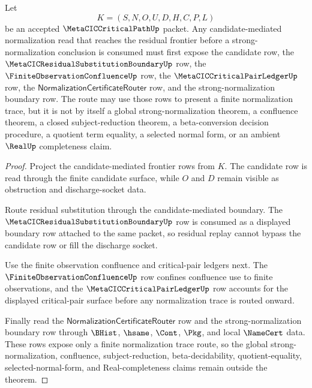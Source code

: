 \begin{theorem}
\label{thm:metacic-normalization-trace-residual-frontier-route}
Let
$$
K=(S,N,O,U,D,H,C,P,L)
$$
be an accepted $\MetaCICCriticalPathUp$ packet. Any candidate-mediated normalization read that reaches the residual frontier before a strong-normalization conclusion is consumed must first expose the candidate row, the $\MetaCICResidualSubstitutionBoundaryUp$ row, the $\FiniteObservationConfluenceUp$ row, the $\MetaCICCriticalPairLedgerUp$ row, the $\mathsf{NormalizationCertificateRouter}$ row, and the strong-normalization boundary row. The route may use those rows to present a finite normalization trace, but it is not by itself a global strong-normalization theorem, a confluence theorem, a closed subject-reduction theorem, a beta-conversion decision procedure, a quotient term equality, a selected normal form, or an ambient $\RealUp$ completeness claim.
\end{theorem}
\begin{proof}
Project the candidate-mediated frontier rows from $K$. The candidate row is read through the finite candidate surface, while $O$ and $D$ remain visible as obstruction and discharge-socket data.

Route residual substitution through the candidate-mediated boundary. The $\MetaCICResidualSubstitutionBoundaryUp$ row is consumed as a displayed boundary row attached to the same packet, so residual replay cannot bypass the candidate row or fill the discharge socket.

Use the finite observation confluence and critical-pair ledgers next. The $\FiniteObservationConfluenceUp$ row confines confluence use to finite observations, and the $\MetaCICCriticalPairLedgerUp$ row accounts for the displayed critical-pair surface before any normalization trace is routed onward.

Finally read the $\mathsf{NormalizationCertificateRouter}$ row and the strong-normalization boundary row through $\BHist$, $\hsame$, $\Cont$, $\Pkg$, and local $\NameCert$ data. These rows expose only a finite normalization trace route, so the global strong-normalization, confluence, subject-reduction, beta-decidability, quotient-equality, selected-normal-form, and Real-completeness claims remain outside the theorem.
\end{proof}

